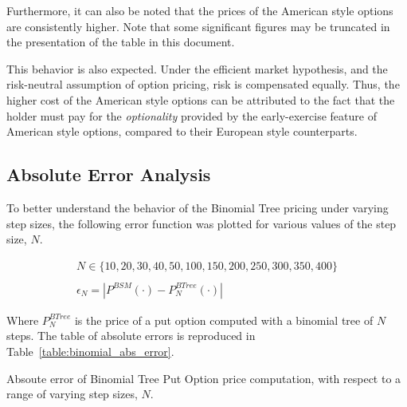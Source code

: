 \documentclass[10pt]{article}
\begin{document}
    Furthermore, it can also be noted that the prices of the American style options are consistently higher. Note that some significant figures may be truncated in the presentation of the table in this document.
    
    This behavior is also expected. Under the efficient market hypothesis, and the risk-neutral assumption of option pricing, risk is compensated equally. Thus, the higher cost of the American style options can be attributed to the fact that the holder must pay for the \textit{optionality} provided by the early-exercise feature of American style options, compared to their European style counterparts.


    \subsection{Absolute Error Analysis}
    
    To better understand the behavior of the Binomial Tree pricing under varying step sizes, the following error function was plotted for various values of the step size, $N$.

    \begin{gather*}
        N \in \{10, 20, 30, 40, 50, 100, 150, 200, 250, 300, 350, 400\} \\
        \\
        \epsilon_N = \left| P^{BSM}(\cdot) - P^{BTree}_N(\cdot) \right|
    \end{gather*}

    Where $P^{BTree}_N$ is the price of a put option computed with a binomial tree of $N$ steps. The table of absolute errors is reproduced in Table~\ref{table:binomial_abs_error}.

    \begin{table}[h]
        \centering
        \caption{Absoute error of Binomial Tree Put Option price computation, with respect to a range of varying step sizes, $N$.}
        \label{table:binomial_abs_error}
    \end{table}


\newpage

\printbibliography


\newpage

\appendix
\end{document}
